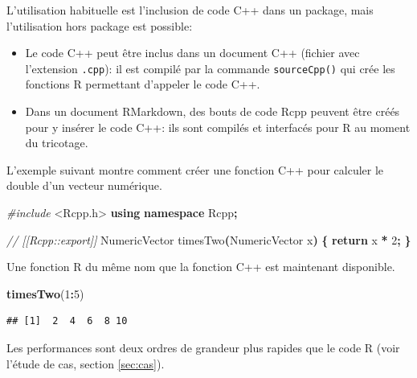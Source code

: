 \documentclass[
  12pt,
  french,
  a4paper,
  extrafontsizes,onecolumn,openright
  ]{memoir}
\newenvironment{Shaded}{\begin{snugshade}}{\end{snugshade}}
\newcommand{\CommentTok}[1]{\textcolor[rgb]{0.56,0.35,0.01}{\textit{#1}}}
\newcommand{\ControlFlowTok}[1]{\textcolor[rgb]{0.13,0.29,0.53}{\textbf{#1}}}
\newcommand{\DecValTok}[1]{\textcolor[rgb]{0.00,0.00,0.81}{#1}}
\newcommand{\FunctionTok}[1]{\textcolor[rgb]{0.13,0.29,0.53}{\textbf{#1}}}
\newcommand{\ImportTok}[1]{#1}
\newcommand{\KeywordTok}[1]{\textcolor[rgb]{0.13,0.29,0.53}{\textbf{#1}}}
\newcommand{\NormalTok}[1]{#1}
\newcommand{\OperatorTok}[1]{\textcolor[rgb]{0.81,0.36,0.00}{\textbf{#1}}}
\newcommand{\PreprocessorTok}[1]{\textcolor[rgb]{0.56,0.35,0.01}{\textit{#1}}}
\newcommand{\SpecialCharTok}[1]{\textcolor[rgb]{0.81,0.36,0.00}{\textbf{#1}}}
\providecommand{\tightlist}{%
  \setlength{\itemsep}{0pt}\setlength{\parskip}{0pt}}
\newlength{\rf}
\begin{document}
L'utilisation habituelle est l'inclusion de code C++ dans un package, mais l'utilisation hors package est possible:

\begin{itemize}
\tightlist
\item
  Le code C++ peut être inclus dans un document C++ (fichier avec l'extension \texttt{.cpp}): il est compilé par la commande \texttt{sourceCpp()} qui crée les fonctions R permettant d'appeler le code C++.
\item
  Dans un document RMarkdown, des bouts de code Rcpp peuvent être créés pour y insérer le code C++: ils sont compilés et interfacés pour R au moment du tricotage.
\end{itemize}

L'exemple suivant montre comment créer une fonction C++ pour calculer le double d'un vecteur numérique.

\scriptsize

\begin{Shaded}
\begin{Highlighting}[]
\PreprocessorTok{\#include }\ImportTok{\textless{}Rcpp.h\textgreater{}}
\KeywordTok{using} \KeywordTok{namespace}\NormalTok{ Rcpp}\OperatorTok{;}

\CommentTok{// [[Rcpp::export]]}
\NormalTok{NumericVector timesTwo}\OperatorTok{(}\NormalTok{NumericVector x}\OperatorTok{)} \OperatorTok{\{}
  \ControlFlowTok{return}\NormalTok{ x }\OperatorTok{*} \DecValTok{2}\OperatorTok{;}
\OperatorTok{\}}
\end{Highlighting}
\end{Shaded}

\normalsize

Une fonction R du même nom que la fonction C++ est maintenant disponible.

\scriptsize

\begin{Shaded}
\begin{Highlighting}[]
\FunctionTok{timesTwo}\NormalTok{(}\DecValTok{1}\SpecialCharTok{:}\DecValTok{5}\NormalTok{)}
\end{Highlighting}
\end{Shaded}

\begin{verbatim}
## [1]  2  4  6  8 10
\end{verbatim}

\normalsize

Les performances sont deux ordres de grandeur plus rapides que le code R (voir l'étude de cas, section \ref{sec:cas}).
\end{document}
